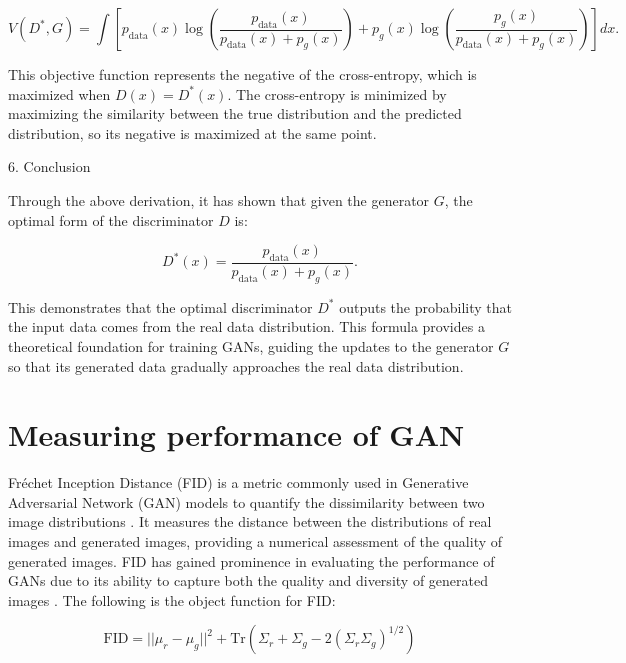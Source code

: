 \begin{equation}
    V(D^*, G) = \int \left[ p_{\text{data}}(x) \log \left( \frac{p_{\text{data}}(x)}{p_{\text{data}}(x) + p_g(x)} \right) + p_g(x) \log \left( \frac{p_g(x)}{p_{\text{data}}(x) + p_g(x)} \right) \right] dx.
\end{equation}

This objective function represents the negative of the cross-entropy, which is maximized when \( D(x) = D^*(x) \). The cross-entropy is minimized by maximizing the similarity between the true distribution and the predicted distribution, so its negative is maximized at the same point.

6. Conclusion

Through the above derivation, it has shown that given the generator \( G \), the optimal form of the discriminator \( D \) is:

\begin{equation}
    D^*(x) = \frac{p_{\text{data}}(x)}{p_{\text{data}}(x) + p_g(x)}.
\end{equation}

This demonstrates that the optimal discriminator \( D^* \) outputs the probability that the input data comes from the real data distribution. 
This formula provides a theoretical foundation for training GANs, guiding the updates to the generator \( G \) so that its generated data gradually approaches the real data distribution.


\section{Measuring performance of GAN}


Fréchet Inception Distance (FID) is a metric commonly used in Generative Adversarial Network (GAN) models 
to quantify the dissimilarity between two image distributions \citep{10.48550/arxiv.2203.06026}. 
It measures the distance between the distributions of real images and generated images, providing 
a numerical assessment of the quality of generated images. FID has gained prominence in evaluating 
the performance of GANs due to its ability to capture both the quality and diversity of generated images \citep{10.3390/app12157599}.
The following is the object function for FID:


\begin{equation}
    \text{FID} = || \mu_r - \mu_g ||^2 + \text{Tr}(\Sigma_r + \Sigma_g - 2(\Sigma_r \Sigma_g)^{1/2})
\end{equation}


